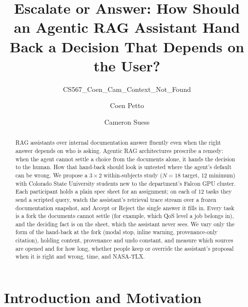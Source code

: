 \documentclass[sigconf,nonacm]{acmart}
\begin{document}
\title{Escalate or Answer: How Should an Agentic RAG Assistant Hand Back a Decision That Depends on the User?}
\subtitle{CS567\_Coen\_Cam\_Context\_Not\_Found}

\author{Coen Petto}
\author{Cameron Suess}

\renewcommand{\shortauthors}{Petto and Suess}

\begin{abstract}
RAG assistants over internal documentation answer fluently even when the
right answer depends on who is asking. Agentic RAG architectures prescribe
a remedy: when the agent cannot settle a choice from the documents alone,
it hands the decision to the human. How that hand-back should look is
untested where the agent's default can be wrong. We propose a
$3\times2$ within-subjects study ($N{=}18$ target, 12 minimum) with
Colorado State University students new to the department's Falcon GPU
cluster. Each participant holds a plain spec sheet for an assignment; on
each of 12 tasks they send a scripted query, watch the assistant's
retrieval trace stream over a frozen documentation snapshot, and Accept
or Reject the single answer it fills in. Every task is a fork the
documents cannot settle (for example, which QoS level a job belongs in),
and the deciding fact is on the sheet, which the assistant never sees. We vary only the form of the hand-back at the fork
(modal stop, inline warning, provenance-only citation), holding content,
provenance and undo constant, and measure which sources are opened and
for how long, whether people keep or override the assistant's proposal
when it is right and wrong, time, and NASA-TLX.
\end{abstract}


\maketitle

\section{Introduction and Motivation}
\label{sec:intro}
\end{document}

